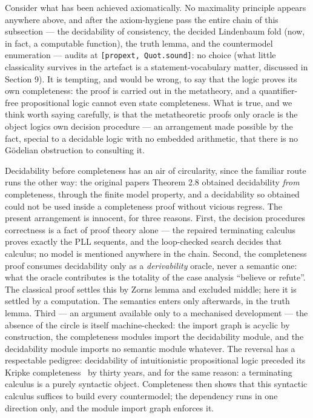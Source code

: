Consider what has been achieved axiomatically. No maximality
principle appears anywhere above, and after the axiom-hygiene pass the
entire chain of this subsection --- the decidability of consistency, the
decided Lindenbaum fold (now, in fact, a computable function), the
truth lemma, and the countermodel enumeration --- audits at
\texttt{[propext, Quot.sound]}: no choice (what little classicality
survives in the artefact is a statement-vocabulary matter, discussed
in Section 9). It is tempting, and would be wrong, to say that the
logic proves its own completeness: the proof
is carried out in the metatheory, and a quantifier-free propositional logic
cannot even state completeness. What is true, and we think worth
saying carefully, is that the metatheoretic proof\textquotesingle s only oracle is the
object logic\textquotesingle s own decision procedure --- an arrangement made possible by
the fact, special to a decidable logic with no embedded arithmetic,
that there is no Gödelian obstruction to consulting it.

\begin{remark}\label{rem:circle}
Decidability before completeness has an air of circularity, since the
familiar route runs the other way: the original paper\textquotesingle s Theorem 2.8
obtained decidability \emph{from} completeness, through the finite
model property, and a decidability so obtained could not be used inside
a completeness proof without vicious regress. The present arrangement
is innocent, for three reasons. First, the decision procedure\textquotesingle s
correctness is a fact of proof theory alone --- the repaired
terminating calculus proves exactly the PLL sequents, and the
loop-checked search decides that calculus; no model is mentioned
anywhere in the chain. Second, the completeness proof consumes
decidability only as a \emph{derivability} oracle, never a semantic
one: what the oracle contributes is the totality of the case analysis
``believe or refute''. The classical proof settles this by Zorn\textquotesingle s lemma and
excluded middle; here it is settled by a computation. The semantics enters
only afterwards, in the truth lemma. Third --- an argument available
only to a mechanised development --- the absence of the circle is
itself machine-checked: the import graph is acyclic by construction,
the completeness modules import the decidability module, and the
decidability module imports no semantic module whatever. The reversal
has a respectable pedigree: decidability of intuitionistic
propositional logic \cite{Gentzen1935} preceded its Kripke
completeness~\cite{Kripke1965} by thirty years, and for the same
reason: a terminating calculus is a purely syntactic object.
Completeness then shows that this syntactic calculus suffices
to build every countermodel; the dependency runs in one direction only, and the
module import graph enforces it.
\end{remark}

